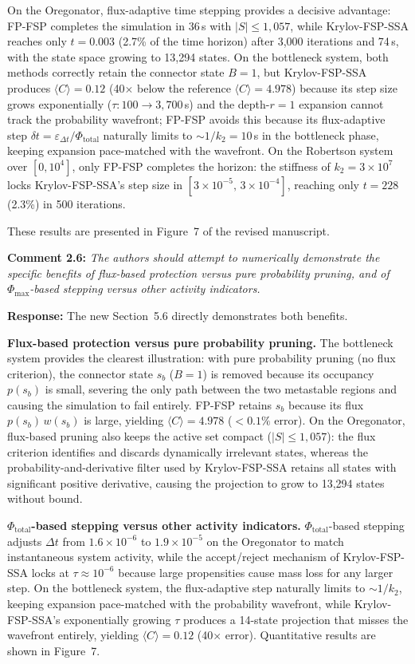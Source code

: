 \documentclass[11pt]{article}
\begin{document}
On the Oregonator, flux-adaptive time stepping provides a decisive advantage:
FP-FSP completes the simulation in 36\,s with $|S| \leq 1{,}057$, while
Krylov-FSP-SSA reaches only $t = 0.003$ (2.7\% of the time horizon) after
3{,}000 iterations and 74\,s, with the state space growing to 13{,}294 states.
On the bottleneck system, both methods correctly retain the connector state
$B{=}1$, but Krylov-FSP-SSA produces $\langle C \rangle = 0.12$ (40$\times$
below the reference $\langle C \rangle = 4.978$) because its step size grows
exponentially ($\tau : 100 \to 3{,}700$\,s) and the depth-$r{=}1$ expansion
cannot track the probability wavefront; FP-FSP avoids this because its
flux-adaptive step $\delta t = \varepsilon_{\Delta t}/\Phi_{\mathrm{total}}$
naturally limits to $\sim 1/k_2 = 10$\,s in the bottleneck phase, keeping
expansion pace-matched with the wavefront. On the Robertson system over $[0, 10^4]$,
only FP-FSP completes the horizon: the stiffness of $k_2 = 3\times10^7$ locks
Krylov-FSP-SSA's step size in $[3\times10^{-5},\, 3\times10^{-4}]$, reaching
only $t = 228$ (2.3\%) in 500 iterations.

These results are presented in Figure~7 of the revised manuscript.

\medskip

\noindent\textbf{Comment 2.6:} \textit{The authors should attempt to
numerically demonstrate the specific benefits of flux-based protection versus
pure probability pruning, and of $\Phi_{\max}$-based stepping versus other
activity indicators.}

\textbf{Response:} The new Section~5.6 directly demonstrates both benefits.

\textbf{Flux-based protection versus pure probability pruning.}
The bottleneck system provides the clearest illustration: with pure probability pruning (no flux criterion), the connector state $s_b$ ($B{=}1$) is removed because its occupancy $p(s_b)$ is small, severing the only path between the two metastable regions and causing the simulation to fail entirely.
FP-FSP retains $s_b$ because its flux $p(s_b)\,w(s_b)$ is large, yielding $\langle C \rangle = 4.978$ ($<0.1\%$ error).
On the Oregonator, flux-based pruning also keeps the active set compact ($|S| \leq 1{,}057$): the flux criterion identifies and discards dynamically irrelevant states, whereas the probability-and-derivative filter used by Krylov-FSP-SSA retains all states with significant positive derivative, causing the projection to grow to 13{,}294 states without bound.

\textbf{$\Phi_{\mathrm{total}}$-based stepping versus other activity indicators.}
$\Phi_{\mathrm{total}}$-based stepping adjusts $\Delta t$ from $1.6\times10^{-6}$ to $1.9\times10^{-5}$ on the Oregonator to match instantaneous system activity, while the accept/reject mechanism of Krylov-FSP-SSA locks at $\tau \approx10^{-6}$ because large propensities cause mass loss for any larger step.
On the bottleneck system, the flux-adaptive step naturally limits to $\sim 1/k_2$, keeping expansion pace-matched with the probability wavefront, while Krylov-FSP-SSA's exponentially growing $\tau$ produces a 14-state projection that misses the wavefront entirely, yielding $\langle C \rangle = 0.12$ (40$\times$ error).
Quantitative results are shown in Figure~7.
\end{document}
